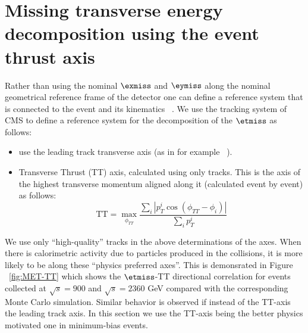 
\section{Missing transverse energy decomposition using the
  event thrust axis }
Rather than using the nominal $\exmiss$ and $\eymiss$ along the nominal
geometrical reference frame of the detector one can define a reference
system that is connected to the event and its kinematics ~\cite{CMS:AN-2009-025}.  We use the
tracking system of CMS to define a reference system for the
decomposition of the $\etmiss$ as follows:

\begin{itemize}
\item use the leading track transverse axis (as in for example ~\cite{CMS:PAS-EWK-008-06}).
\item Transverse Thrust (TT) axis, calculated using only tracks. This
  is the axis of the  highest transverse momentum aligned along it
  (calculated event by event) as follows:
  \begin{equation}
    \mathrm{TT} = \max_{\phi_{TT}}\frac{\sum_{i}|p_{T}^{i}\cos(\phi_{TT}-\phi_{i})|}{\sum_{i}p_{T}^{i}}
  \end{equation}
\end{itemize}

We use only ``high-quality'' tracks in the above determinations of the
axes. When there is calorimetric activity due to particles produced in
the collisions, it is more likely to be along these ``physics
preferred axes''. This is demonsrated in Figure ~\ref{fig:MET-TT}
which shows the $\etmiss$-TT directional correlation for events collected at
$\sqrt{s}=900$ and $\sqrt{s}=2360$ GeV compared with the corresponding
Monte Carlo simulation.  Similar behavior is observed if instead of the
TT-axis the leading track axis. In this section we use the TT-axis
being the better physics motivated one in minimum-bias events.

